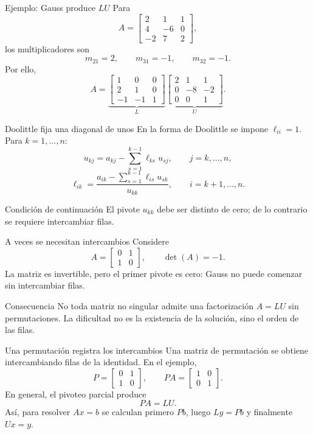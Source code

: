 \documentclass[aspectratio=169,12pt]{beamer}
\newcommand{\mat}[1]{\begin{bmatrix}#1\end{bmatrix}}
\begin{document}
\begin{frame}{Ejemplo: Gauss produce $LU$}
Para
\[
A=\mat{2&1&1\\4&-6&0\\-2&7&2},
\]
los multiplicadores son
\[
m_{21}=2,\qquad m_{31}=-1,\qquad m_{32}=-1.
\]
Por ello,
\[
A=
\underbrace{\mat{1&0&0\\2&1&0\\-1&-1&1}}_{L}
\underbrace{\mat{2&1&1\\0&-8&-2\\0&0&1}}_{U}.
\]
\end{frame}

\begin{frame}{Doolittle fija una diagonal de unos}
En la forma de Doolittle se impone $\ell_{ii}=1$. Para $k=1,\ldots,n$:
\[
u_{kj}=a_{kj}-\sum_{s=1}^{k-1}\ell_{ks}u_{sj},
\qquad j=k,\ldots,n,
\]
\[
\ell_{ik}=\frac{a_{ik}-\displaystyle\sum_{s=1}^{k-1}\ell_{is}u_{sk}}
{u_{kk}},
\qquad i=k+1,\ldots,n.
\]
\begin{block}{Condición de continuación}
El pivote $u_{kk}$ debe ser distinto de cero; de lo contrario se requiere
intercambiar filas.
\end{block}
\end{frame}

\begin{frame}{A veces se necesitan intercambios}
Considere
\[
A=\mat{0&1\\1&0},\qquad \det(A)=-1.
\]
La matriz es invertible, pero el primer pivote es cero: Gauss no puede comenzar
sin intercambiar filas.
\begin{block}{Consecuencia}
No toda matriz no singular admite una factorización $A=LU$ sin permutaciones.
La dificultad no es la existencia de la solución, sino el orden de las filas.
\end{block}
\end{frame}

\begin{frame}{Una permutación registra los intercambios}
Una matriz de permutación se obtiene intercambiando filas de la identidad.
En el ejemplo,
\[
P=\mat{0&1\\1&0},\qquad
PA=\mat{1&0\\0&1}.
\]
En general, el pivoteo parcial produce
\[
\boxed{PA=LU}.
\]
Así, para resolver $Ax=b$ se calculan primero $Pb$, luego
$Ly=Pb$ y finalmente $Ux=y$.
\end{frame}
\end{document}
